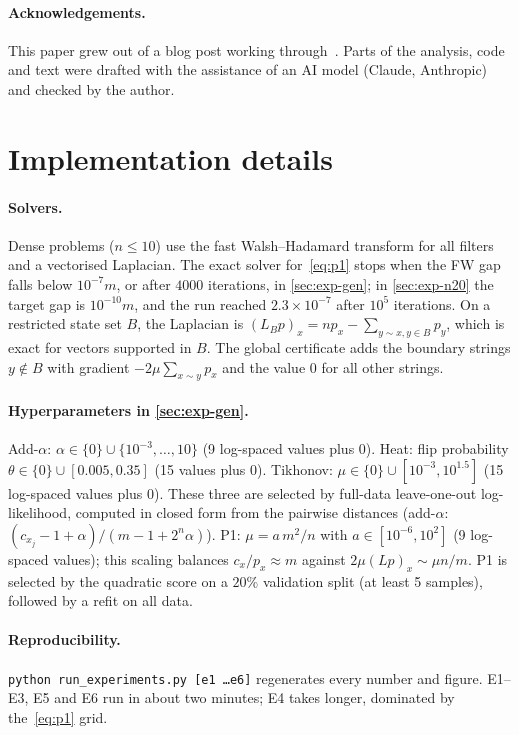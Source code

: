 \documentclass[11pt]{article}
\theoremstyle{definition}
\theoremstyle{remark}
\begin{document}
\paragraph{Acknowledgements.}
This paper grew out of a blog post working through~\cite{belis2026spectral}. Parts of the analysis, code and text were drafted with the assistance of an AI model (Claude, Anthropic) and checked by the author.




\appendix
\section{Implementation details}

\paragraph{Solvers.}
Dense problems ($n\le10$) use the fast Walsh--Hadamard transform for all filters and a vectorised Laplacian. The exact solver for~\eqref{eq:p1} stops when the FW gap falls below $10^{-7}m$, or after $4000$ iterations, in \cref{sec:exp-gen}; in \cref{sec:exp-n20} the target gap is $10^{-10}m$, and the run reached $2.3\times10^{-7}$ after $10^5$ iterations. On a restricted state set $B$, the Laplacian is $(L_Bp)_x=np_x-\sum_{y\sim x,y\in B}p_y$, which is exact for vectors supported in $B$. The global certificate adds the boundary strings $y\notin B$ with gradient $-2\mu\sum_{x\sim y}p_x$ and the value $0$ for all other strings.

\paragraph{Hyperparameters in \cref{sec:exp-gen}.}
Add-$\alpha$: $\alpha\in\{0\}\cup\{10^{-3},\dots,10\}$ (9 log-spaced values plus $0$). Heat: flip probability $\theta\in\{0\}\cup[0.005,0.35]$ (15 values plus $0$). Tikhonov: $\mu\in\{0\}\cup[10^{-3},10^{1.5}]$ (15 log-spaced values plus $0$). These three are selected by full-data leave-one-out log-likelihood, computed in closed form from the pairwise distances (add-$\alpha$: $(c_{x_j}-1+\alpha)/(m-1+2^n\alpha)$). P1: $\mu=a\,m^2/n$ with $a\in[10^{-6},10^2]$ (9 log-spaced values); this scaling balances $c_x/p_x\approx m$ against $2\mu(Lp)_x\sim\mu n/m$. P1 is selected by the quadratic score on a $20\%$ validation split (at least 5 samples), followed by a refit on all data.

\paragraph{Reproducibility.}
\texttt{python run\_experiments.py [e1 \dots e6]} regenerates every number and figure. E1--E3, E5 and E6 run in about two minutes; E4 takes longer, dominated by the~\eqref{eq:p1} grid.
\end{document}
